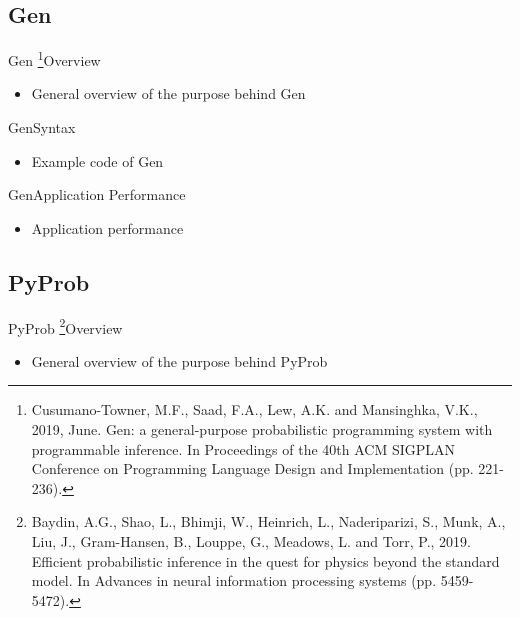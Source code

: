 \documentclass[AERbeamer%
              ,optEnglish%
              ,optBiber%
              ,optBibstyleAlphabetic%
              ,optBeamerClassicFormat%
              ]{AERlatex}%
\begin{document}
\subsection{Gen}
\begin{frame}[c]{Gen \footnote{Cusumano-Towner, M.F., Saad, F.A., Lew, A.K. and Mansinghka, V.K., 2019, June. Gen: a general-purpose
                               probabilistic programming system with programmable inference. In Proceedings of the 40th ACM SIGPLAN
                               Conference on Programming Language Design and Implementation (pp. 221-236).}}{Overview}
    \centering
    \begin{itemize} %
        \item General overview of the purpose behind Gen
    \end{itemize}
\end{frame}


\begin{frame}[c]{Gen}{Syntax}
    \centering
    \begin{itemize}
        \item Example code of Gen
    \end{itemize}
\end{frame}


\begin{frame}[c]{Gen}{Application Performance}
    \centering
    \begin{itemize}
        \item Application performance
    \end{itemize}
\end{frame}


\subsection{PyProb}
\begin{frame}[c]{PyProb \footnote{Baydin, A.G., Shao, L., Bhimji, W., Heinrich, L., Naderiparizi, S., Munk, A., Liu, J., Gram-Hansen, B.,
                                  Louppe, G., Meadows, L. and Torr, P., 2019. Efficient probabilistic inference in the quest for physics
                                  beyond the standard model. In Advances in neural information processing systems (pp. 5459-5472).}}{Overview}
    \centering
    \begin{itemize}
        \item General overview of the purpose behind PyProb
    \end{itemize}
\end{frame}
\end{document}
